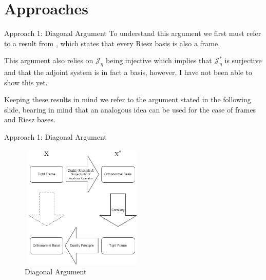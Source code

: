 \documentclass{beamer}
\begin{document}

\section{Approaches}

\begin{frame}{Approach 1: Diagonal Argument}
To understand this argument we first must refer to a result from \textbf{\cite{christensen2008frames}}, which states that every Riesz basis is also a frame.

This argument also relies on $\mathcal{J}_\eta$ being injective which implies that $\mathcal{J}^*_\eta$ is surjective and that the adjoint system is in fact a basis, however, I have not been able to show this yet.

Keeping these results in mind we refer to the argument stated in the following slide, bearing in mind that an analogous idea can be used for the case of frames and Riesz bases.
\end{frame}

\begin{frame}{Approach 1: Diagonal Argument}
    \begin{figure}[H]
\centering
\includegraphics[width=14pc,height=14pc,keepaspectratio]{diagram}
\decoRule
\caption{Diagonal Argument}
\label{fig:diagram}
\end{figure}
\end{frame}
\end{document}
